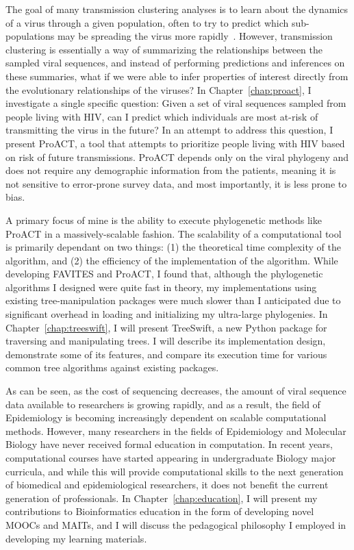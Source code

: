 The goal of many transmission clustering analyses is to learn about the dynamics of a virus through a given population, often to try to predict which sub-populations may be spreading the virus more rapidly~\cite{Wertheim2011,Wertheim2017,Little2014}. However, transmission clustering is essentially a way of summarizing the relationships between the sampled viral sequences, and instead of performing predictions and inferences on these summaries, what if we were able to infer properties of interest directly from the evolutionary relationships of the viruses? In Chapter~\ref{chap:proact}, I investigate a single specific question: Given a set of viral sequences sampled from people living with \gls{HIV}, can I predict which individuals are most at-risk of transmitting the virus in the future? In an attempt to address this question, I present ProACT, a tool that attempts to prioritize people living with \gls{HIV} based on risk of future transmissions. ProACT depends only on the viral phylogeny and does not require any demographic information from the patients, meaning it is not sensitive to error-prone survey data, and most importantly, it is less prone to bias.

A primary focus of mine is the ability to execute phylogenetic methods like ProACT in a massively-scalable fashion. The scalability of a computational tool is primarily dependant on two things: (1) the theoretical time complexity of the algorithm, and (2) the efficiency of the implementation of the algorithm. While developing FAVITES and ProACT, I found that, although the phylogenetic algorithms I designed were quite fast in theory, my implementations using existing tree-manipulation packages were much slower than I anticipated due to significant overhead in loading and initializing my ultra-large phylogenies. In Chapter~\ref{chap:treeswift}, I will present TreeSwift, a new Python package for traversing and manipulating trees. I will describe its implementation design, demonstrate some of its features, and compare its execution time for various common tree algorithms against existing packages.

As can be seen, as the cost of sequencing decreases, the amount of viral sequence data available to researchers is growing rapidly, and as a result, the field of Epidemiology is becoming increasingly dependent on scalable computational methods. However, many researchers in the fields of Epidemiology and Molecular Biology have never received formal education in computation. In recent years, computational courses have started appearing in undergraduate Biology major curricula, and while this will provide computational skills to the next generation of biomedical and epidemiological researchers, it does not benefit the current generation of professionals. In Chapter~\ref{chap:education}, I will present my contributions to Bioinformatics education in the form of developing novel \glspl{MOOC} and \glspl{MAIT}, and I will discuss the pedagogical philosophy I employed in developing my learning materials.

